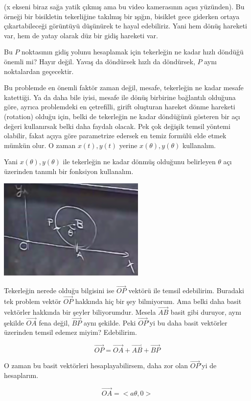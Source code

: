 \documentclass[12pt,fleqn]{article}\usepackage{../../common}
\begin{document}
(x ekseni biraz sağa yatik çıkmış ama bu video kamerasının açısı yüzünden). Bu
örneği bir bisikletin tekerliğine takılmış bir ışığın, bisiklet gece giderken
ortaya çıkartabileceği görüntüyü düşünürek te hayal edebiliriz. Yani hem dönüş
hareketi var, hem de yatay olarak düz bir gidiş hareketi var.

Bu $P$ noktasının gidiş yolunu hesaplamak için tekerleğin ne kadar hızlı
döndüğü önemli mi? Hayır değil. Yavaş da döndürsek hızlı da döndürsek, $P$ aynı
noktalardan geçecektir. 

Bu problemde en önemli faktör zaman değil, mesafe, tekerleğin ne kadar mesafe
katettiği. Ya da daha bile iyisi, mesafe ile dönüş birbirine bağlantılı olduğuna
göre, ayrıca problemdeki en çetrefilli, girift oluşturan hareket dönme hareketi
(rotation) olduğu için, belki de tekerleğin ne kadar döndüğünü gösteren bir açı
değeri kullanırsak belki daha faydalı olacak. Pek çok değişik temsil yöntemi
olabilir, fakat açıya göre parametrize edersek en temiz formülü elde etmek
mümkün olur. O zaman $x(t),y(t)$ yerine $x(\theta),y(\theta)$ kullanalım.

Yani $x(\theta),y(\theta)$ ile tekerleğin ne kadar dönmüş olduğunu
belirleyen $\theta$ açı üzerinden tanımlı bir fonksiyon kullanalım. 

\includegraphics[height=5cm]{5_4.png}

Tekerleğin nerede olduğu bilgisini ise $\vec{OP}$ vektörü ile temsil
edebilirim. Buradaki tek problem vektör $\vec{OP}$ hakkında hiç bir şey
bilmiyorum. Ama belki daha basit vektörler hakkında bir şeyler
biliyorumdur. Mesela $\vec{AB}$ basit gibi duruyor, aynı şekilde $\vec{OA}$ fena
değil, $\vec{BP}$ aynı şekilde. Peki $\vec{OP}$'yi bu daha basit vektörler
üzerinden temsil edemez miyim? Edebilirim.

$$ \vec{OP} = \vec{OA} + \vec{AB} + \vec{BP} $$

O zaman bu basit vektörleri hesaplayabilirsem, daha zor olan $\vec{OP}$'yi
de hesaplarım. 

$$ \vec{OA} = < a\theta, 0 > $$
\end{document}
